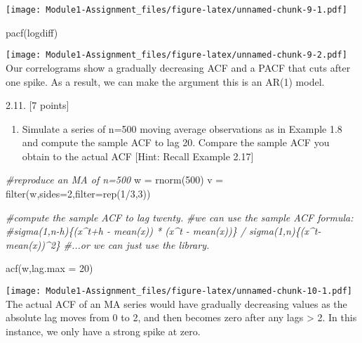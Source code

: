 \documentclass[
]{article}
\newenvironment{Shaded}{\begin{snugshade}}{\end{snugshade}}
\newcommand{\AttributeTok}[1]{\textcolor[rgb]{0.77,0.63,0.00}{#1}}
\newcommand{\CommentTok}[1]{\textcolor[rgb]{0.56,0.35,0.01}{\textit{#1}}}
\newcommand{\DecValTok}[1]{\textcolor[rgb]{0.00,0.00,0.81}{#1}}
\newcommand{\FunctionTok}[1]{\textcolor[rgb]{0.00,0.00,0.00}{#1}}
\newcommand{\NormalTok}[1]{#1}
\newcommand{\OtherTok}[1]{\textcolor[rgb]{0.56,0.35,0.01}{#1}}
\newcommand{\SpecialCharTok}[1]{\textcolor[rgb]{0.00,0.00,0.00}{#1}}
\providecommand{\tightlist}{%
  \setlength{\itemsep}{0pt}\setlength{\parskip}{0pt}}
\begin{document}
\texttt{[image: Module1-Assignment\_files/figure-latex/unnamed-chunk-9-1.pdf]}

\begin{Shaded}
\begin{Highlighting}[]
\FunctionTok{pacf}\NormalTok{(logdiff)}
\end{Highlighting}
\end{Shaded}

\texttt{[image: Module1-Assignment\_files/figure-latex/unnamed-chunk-9-2.pdf]}
Our correlograms show a gradually decreasing ACF and a PACF that cuts
after one spike. As a result, we can make the argument this is an AR(1)
model.

2.11. {[}7 points{]}

\begin{enumerate}
\def\labelenumi{\alph{enumi})}
\tightlist
\item
  Simulate a series of n=500 moving average observations as in Example
  1.8 and compute the sample ACF to lag 20. Compare the sample ACF you
  obtain to the actual ACF {[}Hint: Recall Example 2.17{]}
\end{enumerate}

\begin{Shaded}
\begin{Highlighting}[]
\CommentTok{\#reproduce an MA of n=500}
\NormalTok{w }\OtherTok{=} \FunctionTok{rnorm}\NormalTok{(}\DecValTok{500}\NormalTok{)}
\NormalTok{v }\OtherTok{=} \FunctionTok{filter}\NormalTok{(w,}\AttributeTok{sides=}\DecValTok{2}\NormalTok{,}\AttributeTok{filter=}\FunctionTok{rep}\NormalTok{(}\DecValTok{1}\SpecialCharTok{/}\DecValTok{3}\NormalTok{,}\DecValTok{3}\NormalTok{))}

\CommentTok{\#compute the sample ACF to lag twenty.}
\CommentTok{\#we can use the sample ACF formula:}
\CommentTok{\#sigma(1,n{-}h)\{(x\^{}t+h {-} mean(x)) * (x\^{}t {-} mean(x))\} / sigma(1,n)\{(x\^{}t{-}mean(x))\^{}2\}}
\CommentTok{\#...or we can just use the library.}

\FunctionTok{acf}\NormalTok{(w,}\AttributeTok{lag.max =} \DecValTok{20}\NormalTok{)}
\end{Highlighting}
\end{Shaded}

\texttt{[image: Module1-Assignment\_files/figure-latex/unnamed-chunk-10-1.pdf]}
The actual ACF of an MA series would have gradually decreasing values as
the absolute lag moves from 0 to 2, and then becomes zero after any lags
\textgreater{} 2. In this instance, we only have a strong spike at zero.
\end{document}

